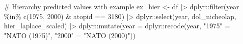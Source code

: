 \documentclass[
  12,
  letterpaper,
  DIV=11,
  numbers=noendperiod]{scrartcl}
\newenvironment{Shaded}{\begin{snugshade}}{\end{snugshade}}
\newcommand{\AttributeTok}[1]{\textcolor[rgb]{0.40,0.45,0.13}{#1}}
\newcommand{\CommentTok}[1]{\textcolor[rgb]{0.37,0.37,0.37}{#1}}
\newcommand{\DecValTok}[1]{\textcolor[rgb]{0.68,0.00,0.00}{#1}}
\newcommand{\FunctionTok}[1]{\textcolor[rgb]{0.28,0.35,0.67}{#1}}
\newcommand{\NormalTok}[1]{\textcolor[rgb]{0.00,0.23,0.31}{#1}}
\newcommand{\OtherTok}[1]{\textcolor[rgb]{0.00,0.23,0.31}{#1}}
\newcommand{\SpecialCharTok}[1]{\textcolor[rgb]{0.37,0.37,0.37}{#1}}
\newcommand{\StringTok}[1]{\textcolor[rgb]{0.13,0.47,0.30}{#1}}
\begin{document}
\begin{Shaded}
\begin{Highlighting}[numbers=left,,]
\CommentTok{\# Hierarchy predicted values with example}
\NormalTok{ex\_hier }\OtherTok{\textless{}{-}}\NormalTok{ df }\SpecialCharTok{|\textgreater{}}
\NormalTok{  dplyr}\SpecialCharTok{::}\FunctionTok{filter}\NormalTok{(year }\SpecialCharTok{\%in\%} \FunctionTok{c}\NormalTok{(}\DecValTok{1975}\NormalTok{, }\DecValTok{2000}\NormalTok{) }\SpecialCharTok{\&}\NormalTok{ atopid }\SpecialCharTok{==} \DecValTok{3180}\NormalTok{) }\SpecialCharTok{|\textgreater{}}
\NormalTok{  dplyr}\SpecialCharTok{::}\FunctionTok{select}\NormalTok{(year, dol\_nicheolap, hier\_laplace\_scaled) }\SpecialCharTok{|\textgreater{}}
\NormalTok{  dplyr}\SpecialCharTok{::}\FunctionTok{mutate}\NormalTok{(}\AttributeTok{year =}\NormalTok{ dplyr}\SpecialCharTok{::}\FunctionTok{recode}\NormalTok{(year,}
                                       \StringTok{"1975"} \OtherTok{=} \StringTok{"NATO (1975)"}\NormalTok{,}
                                       \StringTok{"2000"} \OtherTok{=} \StringTok{"NATO (2000)"}\NormalTok{))}


\end{Highlighting}
\end{Shaded}
\end{document}
